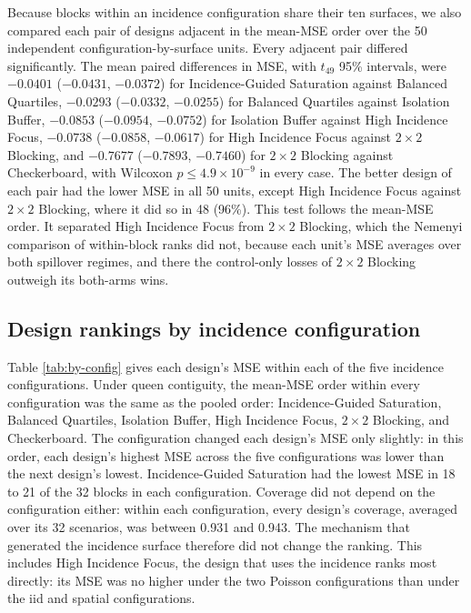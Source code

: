 \documentclass[11pt]{article}
\begin{document}
Because blocks within an incidence configuration share their ten
surfaces, we also compared each pair of designs adjacent in the mean-MSE
order over the 50 independent configuration-by-surface units. Every
adjacent pair differed significantly. The mean paired differences in
MSE, with \(t_{49}\) 95\% intervals, were \(-0.0401\) (\(-0.0431\),
\(-0.0372\)) for Incidence-Guided Saturation against Balanced
Quartiles, \(-0.0293\) (\(-0.0332\), \(-0.0255\)) for Balanced Quartiles
against Isolation Buffer, \(-0.0853\) (\(-0.0954\), \(-0.0752\)) for
Isolation Buffer against High Incidence Focus, \(-0.0738\) (\(-0.0858\),
\(-0.0617\)) for High Incidence Focus against \(2\times2\) Blocking, and
\(-0.7677\) (\(-0.7893\), \(-0.7460\)) for \(2\times2\) Blocking against
Checkerboard, with Wilcoxon \(p \le 4.9\times10^{-9}\) in every case.
The better design of each pair had the lower MSE in all 50 units, except
High Incidence Focus against \(2\times2\) Blocking, where it did so in
48 (96\%). This test follows the mean-MSE order. It separated High
Incidence Focus from \(2\times2\) Blocking, which the Nemenyi comparison
of within-block ranks did not, because each unit's MSE averages over
both spillover regimes, and there the control-only losses of
\(2\times2\) Blocking outweigh its both-arms wins.

\subsection{Design rankings by incidence
configuration}\label{design-rankings-by-incidence-configuration}

Table \ref{tab:by-config} gives each design's MSE within each of the
five incidence configurations. Under queen contiguity, the mean-MSE
order within every configuration was the same as the pooled order:
Incidence-Guided Saturation, Balanced Quartiles, Isolation
Buffer, High Incidence Focus, \(2\times2\) Blocking, and Checkerboard.
The configuration changed each design's MSE only slightly: in this
order, each design's highest MSE across the five configurations was
lower than the next design's lowest. Incidence-Guided Saturation had the lowest MSE in 18 to 21 of the 32 blocks in each
configuration. Coverage did not depend on the configuration either:
within each configuration, every design's coverage, averaged over its 32
scenarios, was between 0.931 and 0.943. The mechanism that generated the
incidence surface therefore did not change the ranking. This includes
High Incidence Focus, the design that uses the incidence ranks most
directly: its MSE was no higher under the two Poisson configurations
than under the iid and spatial configurations.
\end{document}
